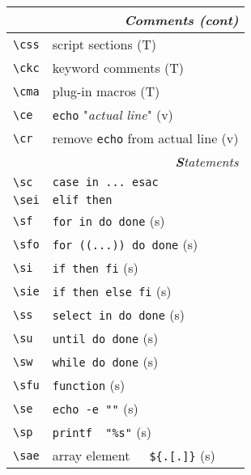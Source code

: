 \documentclass[oneside,11pt,landscape,DIV16]{scrartcl}
\begin{document}
\begin{multicols}{3}
\begin{center}
\begin{tabular}[]{|p{11mm}|p{60mm}|}
\hline
	\multicolumn{2}{|r|}{\textsl{\textbf{C}omments (cont)}}                       \\[1.0ex]
\hline     \verb'\css'  & script sections                       \hfill (T)\\
\hline     \verb'\ckc'  & keyword comments                      \hfill (T)\\
\hline     \verb'\cma'  & plug-in macros                        \hfill (T)\\
%
\hline     \verb'\ce'   & \texttt{echo} "\textsl{actual line}"  \hfill (v)\\
\hline     \verb'\cr'   & remove \texttt{echo} from actual line \hfill (v)\\
\hline
\hline
\multicolumn{2}{|r|}{\textsl{\textbf{S}tatements}}                    \\[1.0ex]
\hline \verb'\sc'  & \verb'case in ... esac'               \\
\hline \verb'\sei' & \verb'elif then'                      \\
\hline \verb'\sf'  & \verb'for in do done'                 \hfill (s)\\
\hline \verb'\sfo' & \verb'for ((...)) do done'            \hfill (s)\\
\hline \verb'\si'  & \verb'if then fi'                     \hfill (s)\\
\hline \verb'\sie' & \verb'if then else fi'                \hfill (s)\\
\hline \verb'\ss'  & \verb'select in do done'              \hfill (s)\\
\hline \verb'\su'  & \verb'until do done'                  \hfill (s)\\
\hline \verb'\sw'  & \verb'while do done'                  \hfill (s)\\
\hline \verb'\sfu' & \verb'function'                       \hfill (s)\\
%
\hline \verb'\se'  & \verb'echo -e ""'                     \hfill (s)\\
\hline \verb'\sp'  & \verb'printf  "%s"'                   \hfill (s)\\
%
\hline \verb'\sae' & array element\ \ \ \verb'${.[.]}'     \hfill (s)\\

\end{tabular}
\end{center}
\end{multicols}
\end{document}
